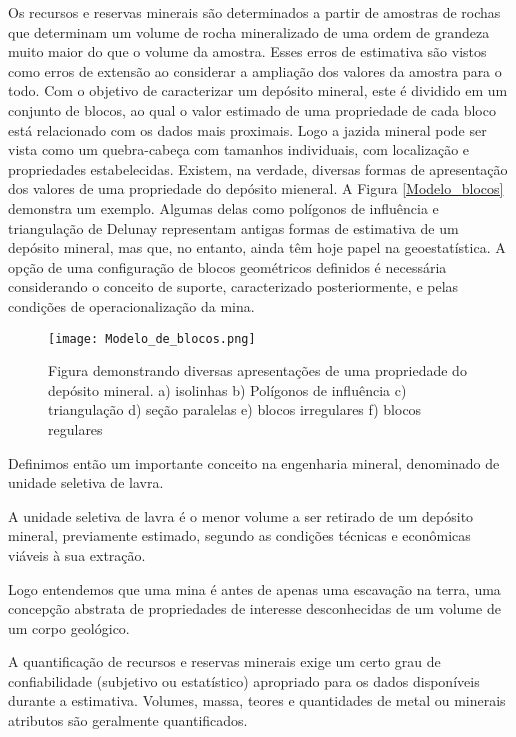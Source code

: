 Os recursos e reservas minerais são determinados a partir de amostras de rochas que determinam um volume de rocha mineralizado de uma ordem de grandeza muito maior do que o volume da amostra. Esses erros de estimativa são vistos como erros de extensão ao considerar a ampliação dos valores da amostra para o todo. Com o objetivo de caracterizar um depósito mineral, este é dividido em um conjunto de blocos, ao qual o valor estimado de uma propriedade de cada bloco está relacionado com os dados mais proximais. Logo a jazida mineral pode ser vista como um quebra-cabeça com tamanhos individuais, com localização e propriedades estabelecidas. Existem, na verdade, diversas formas de apresentação dos valores de uma propriedade do depósito mieneral. A Figura \eqref{Modelo_blocos} demonstra um exemplo. Algumas delas como polígonos de influência e triangulação de Delunay representam antigas formas de estimativa de um depósito mineral, mas que, no entanto, ainda têm hoje papel na geoestatística. A opção de uma configuração de blocos geométricos definidos é necessária considerando o conceito de suporte, caracterizado posteriormente, e pelas condições de operacionalização da mina.

\begin{figure}[H]
	\centering
	\texttt{[image: Modelo\_de\_blocos.png]}	
	\caption{Figura demonstrando diversas apresentações de uma propriedade do depósito mineral. a) isolinhas b) Polígonos de influência c) triangulação d) seção paralelas e) blocos irregulares f) blocos regulares }
	\label{Modelo_blocos}
\end{figure}

Definimos então um importante conceito na engenharia mineral, denominado de unidade seletiva de lavra. 
\begin{remark}
A unidade seletiva de lavra é o menor volume a ser retirado de um depósito mineral, previamente estimado, segundo as condições técnicas e econômicas viáveis à sua extração.
\end{remark}

Logo entendemos que uma mina é antes de apenas uma escavação na terra, uma concepção abstrata de propriedades de interesse desconhecidas de um volume de um corpo geológico.
  
A quantificação de recursos e reservas minerais exige um certo grau de confiabilidade (subjetivo ou estatístico) apropriado para os dados disponíveis durante a estimativa. Volumes, massa, teores e quantidades de metal ou minerais atributos são geralmente quantificados.  


